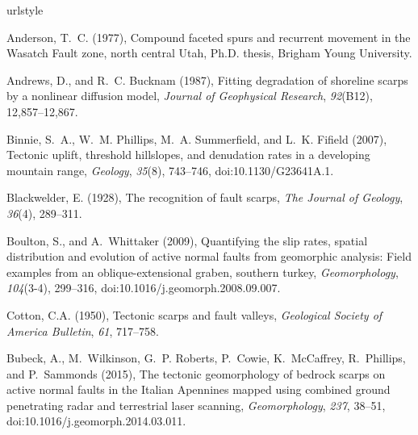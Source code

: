 \begin{thebibliography}{41}
\providecommand{\natexlab}[1]{#1}
\expandafter\ifx\csname urlstyle\endcsname\relax
  \providecommand{\doi}[1]{doi:\discretionary{}{}{}#1}\else
  \providecommand{\doi}{doi:\discretionary{}{}{}\begingroup
  \urlstyle{rm}\Url}\fi

Anderson, T.~C. (1977), {Compound faceted spurs and recurrent movement in the
  Wasatch Fault zone, north central Utah}, Ph.D. thesis, Brigham Young
  University.

Andrews, D., and R.~C. Bucknam (1987), Fitting degradation of shoreline scarps
  by a nonlinear diffusion model, \textit{Journal of Geophysical Research},
  \textit{92}(B12), 12,857--12,867.

Binnie, S.~A., W.~M. Phillips, M.~A. Summerfield, and L.~K. Fifield (2007),
  Tectonic uplift, threshold hillslopes, and denudation rates in a developing
  mountain range, \textit{Geology}, \textit{35}(8), 743--746,
  \doi{10.1130/G23641A.1}.

Blackwelder, E. (1928), The recognition of fault scarps, \textit{The Journal of
  Geology}, \textit{36}(4), 289--311.

Boulton, S., and A.~Whittaker (2009), Quantifying the slip rates, spatial
  distribution and evolution of active normal faults from geomorphic analysis:
  Field examples from an oblique-extensional graben, southern turkey,
  \textit{Geomorphology}, \textit{104}(3-4), 299--316,
  \doi{10.1016/j.geomorph.2008.09.007}.

Cotton, C.A. (1950), Tectonic scarps and fault valleys,
  \textit{Geological Society of America Bulletin}, \textit{61}, 717--758.

Bubeck, A., M.~Wilkinson, G.~P. Roberts, P.~Cowie, K.~McCaffrey, R.~Phillips,
  and P.~Sammonds (2015), {The tectonic geomorphology of bedrock scarps on
  active normal faults in the Italian Apennines mapped using combined ground
  penetrating radar and terrestrial laser scanning}, \textit{Geomorphology},
  \textit{237}, 38--51, \doi{10.1016/j.geomorph.2014.03.011}.


\end{thebibliography}
